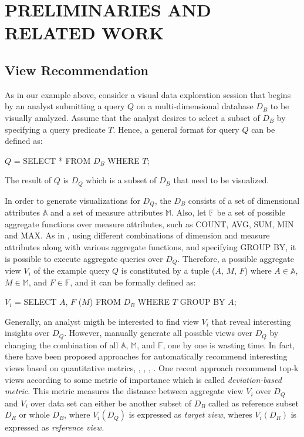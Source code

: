 
\section{PRELIMINARIES AND RELATED WORK}
\subsection{View Recommendation}

As in our example above, consider a visual data exploration session that begins by an analyst submitting a query $Q$ on a multi-dimensional database $D_B$ to be visually analyzed. Assume that the analyst desires to select a subset of $D_B$  by specifying a query predicate $T$. Hence, a general format for query $Q$ can be defined as: 

\bigskip
$Q$ = SELECT * FROM $D_B$ WHERE $T$;
\bigskip

The result of $Q$ is $D_Q$ which is a subset of $D_B$ that need to be visualized.

In order to generate visualizations for $D_Q$, the $D_B$ consists of a set of dimensional attributes $\mathbb{A}$ and a set of measure attributes $\mathbb{M}$. Also, let $\mathbb{F}$ be a set of possible aggregate functions over measure attributes, such as COUNT, AVG, SUM, MIN and MAX. As in \cite{Vartak2015}, using different combinations of dimension and measure attributes along with various aggregate functions, and specifying GROUP BY, it is possible to execute aggregate queries over $D_Q$.  %
Therefore, a possible aggregate view $V_i$ of the example query $Q$ is constituted by a tuple ($ A $, $ M $, $ F $) where $A \in \mathbb{A}$, $M\in \mathbb{M}$, and  $F \in \mathbb{F}$, and it can be formally defined as:

\bigskip
$V_i$  = SELECT $A$, $F$ ($M$) FROM $D_B$ WHERE $T$ GROUP BY $A$;
\bigskip

Generally, an analyst migth be interested to find view $V_i$ that reveal interesting insights over $D_Q$. However, manually generate all possible views over $D_Q$ by changing the combination of all $ \mathbb{A} $, $ \mathbb{M} $, and $ \mathbb{F} $, one by one is wasting time. In fact, there have been proposed approaches for automatically recommend interesting views based on quantitative metrics\cite{Key2012}, \cite{Viegas2007}, \cite{Vartak2014}, \cite{Vartak2015}, \cite{Ehsan2016}. One recent approach \cite{Vartak2015} recommend top-k views according to some metric of importance which is called \textit{deviation-based metric}. This metric measures the distance between aggregate view $V_i$ over $D_Q$ and $V_i$ over data set can either be another subset of $D_B$ called as reference subset $D_R$ or whole $D_B$, where $V_i(D_Q)$ is expressed as \textit{target view}, wheres $V_i(D_R)$ is expressed as \textit{reference view}. 

